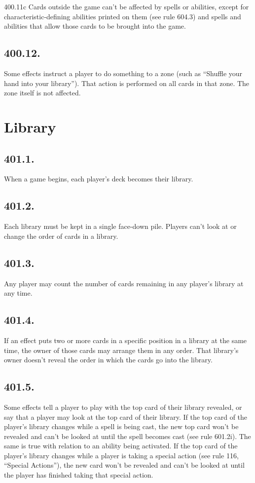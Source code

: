 400.11c Cards outside the game can’t be affected by spells or abilities, except for characteristic-defining abilities printed on them (see rule 604.3) and spells and abilities that allow those cards to be brought into the game.

\subsection*{400.12.}
Some effects instruct a player to do something to a zone (such as “Shuffle your hand into your library”). That action is performed on all cards in that zone. The zone itself is not affected.

\section{Library}
\subsection*{401.1.}
When a game begins, each player’s deck becomes their library.

\subsection*{401.2.}
Each library must be kept in a single face-down pile. Players can’t look at or change the order of cards in a library.

\subsection*{401.3.}
Any player may count the number of cards remaining in any player’s library at any time.

\subsection*{401.4.}
If an effect puts two or more cards in a specific position in a library at the same time, the owner of those cards may arrange them in any order. That library’s owner doesn’t reveal the order in which the cards go into the library.

\subsection*{401.5.}
Some effects tell a player to play with the top card of their library revealed, or say that a player may look at the top card of their library. If the top card of the player’s library changes while a spell is being cast, the new top card won’t be revealed and can’t be looked at until the spell becomes cast (see rule 601.2i). The same is true with relation to an ability being activated. If the top card of the player’s library changes while a player is taking a special action (see rule 116, “Special Actions”), the new card won’t be revealed and can’t be looked at until the player has finished taking that special action.

